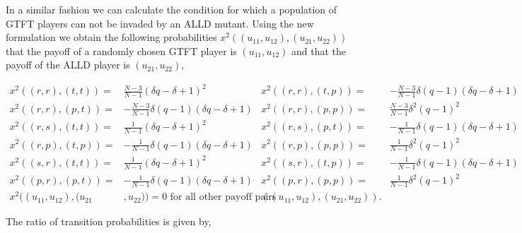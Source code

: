 \documentclass[11pt]{article}
\theoremstyle{plainCl1}
\theoremstyle{plainCl2}
\begin{document}
In a similar fashion we can calculate the condition for which a population of
GTFT players can not be invaded by an ALLD mutant. Using the new formulation we
obtain the following probabilities \(x^{2}((u_{11}, u_{12}), (u_{21}, u_{22}))\) that the payoff of a randomly
chosen GTFT player is \((u_{11}, u_{12})\) and that the payoff of the ALLD player is \((u_{21}, u_{22})\),

\begin{align*}
  x^{2}((r, r), (t, t)) = & \frac{N - 3}{N - 1}\left(\delta q - \delta + 1\right)^{2} & 
  x^{2}((r, r), (t, p)) = & - \frac{N - 3}{N - 1} \delta \left(q - 1\right) \left(\delta q - \delta + 1\right)\\
  x^{2}((r, r), (p, t)) = & - \frac{N - 3}{N - 1} \delta \left(q - 1\right) \left(\delta q - \delta + 1\right) &
  x^{2}((r, r), (p, p)) = & \frac{N - 3}{N - 1} \delta^{2}  \left(q - 1\right)^{2}\\
  x^{2}((r, s), (t, t)) = & \frac{1}{N-1} \left(\delta q - \delta + 1\right)^{2} &
  x^{2}((r, s), (p, t)) = & - \frac{1}{N-1} \delta \left(q - 1\right) \left(\delta q - \delta + 1\right) \\
  x^{2}((r, p), (t, p)) = & - \frac{1}{N-1} \delta \left(q - 1\right) \left(\delta q - \delta + 1\right) &
  x^{2}((r, p), (p, p)) = & \frac{1}{N-1} \delta^{2} \left(q - 1\right)^{2} \\
  x^{2}((s, r), (t, t)) = & \frac{1}{N-1} \left(\delta q - \delta + 1\right)^{2} &
  x^{2}((s, r), (t, p)) = & - \frac{1}{N-1} \delta \left(q - 1\right) \left(\delta q - \delta + 1\right)\\
  x^{2}((p, r), (p, t)) = & - \frac{1}{N-1} \delta \left(q - 1\right) \left(\delta q - \delta + 1\right) &
  x^{2}((p, r), (p, p)) = & \frac{1}{N-1} \delta^{2} \left(q - 1\right)^{2} \\
  x^{2}((u_{11}, u_{12}), (u_{21}&, u_{22})) =  0 \text{ for all other payoff pairs} & ((u_{11}, u_{12}), (u_{21}, u_{22})). &
\end{align*}

The ratio of transition probabilities is given by,
\end{document}
